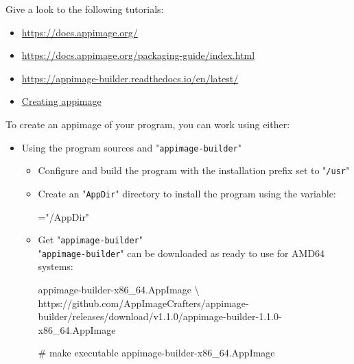 Give a look to the following tutorials:
\begin{itemize}
\item \href{https://docs.appimage.org/}{https://docs.appimage.org/}
\item \href{https://docs.appimage.org/packaging-guide/index.html}{https://docs.appimage.org/packaging-guide/index.html}
\item \href{https://appimage-builder.readthedocs.io/en/latest/}{https://appimage-builder.readthedocs.io/en/latest/}
\item \href{https://github.com/AppImage/AppImageKit/wiki/Creating-AppImages/cc2441518975caca23e9ce2dba6f08a22c678d1e}{Creating appimage}
\end{itemize}
To create an appimage of your program, you can work using either:
\begin{itemize}
\item Using the program sources and "\texttt{appimage-builder}"
\begin{itemize}
\item Configure and build the program with the installation prefix set to "\texttt{/usr}"
{\footnotesize{
\begin{scriptii}
 
\end{scriptii}
}}
\item Create an "\texttt{AppDir}" directory to install the program using the  variable: 
{\footnotesize{
\begin{scriptii}
 
  ="/AppDir"
\end{scriptii}
}}
\item Get "\texttt{appimage-builder}" \\[0.5cm]
"\texttt{appimage-builder}" can be downloaded as ready to use for AMD64 systems:
{\tiny{
\begin{scriptii}
  appimage-builder-x86\_64.AppImage \textbackslash
https://github.com/AppImageCrafters/appimage-builder/releases/download/v1.1.0/appimage-builder-1.1.0-x86\_64.AppImage

# make executable
  appimage-builder-x86\_64.AppImage


\end{scriptii}}}
\end{itemize}
\end{itemize}
